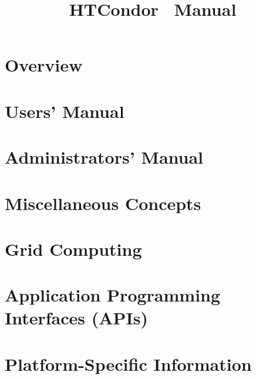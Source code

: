 \documentclass[titlepage,oneside,latex2html,bookmarks,bookmarksnumbered,plainpages=false,pdfpagelabels]{book}
\begin{document}
\title{HTCondor\textsuperscript{\small{\texttrademark}} \VersionNotice\ Manual}
\author{\AuthorNotice}
\maketitle


\tableofcontents

\sloppy

\begin{small}

\end{small}

\newpage
{}

\chapter{Overview}
\label{overview}


\chapter{Users' Manual}
\label{user-manual}


\chapter{Administrators' Manual}
\label{admin-manual}


\chapter{Miscellaneous Concepts}
\label{misc-concepts}


\chapter{Grid Computing}
\label{grid-computing}


\chapter{Application Programming Interfaces (APIs)}
\label{APIs}


\chapter{Platform-Specific Information}
\label{platforms}

\end{document}
